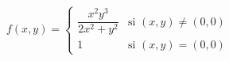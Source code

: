 \item $f(x,y) = \begin{cases} \dfrac{x^2y^3}{2x^2+y^2} & \text{si } (x,y) \neq (0,0) \\ 1 & \text{si } (x,y) = (0,0) \end{cases}$
